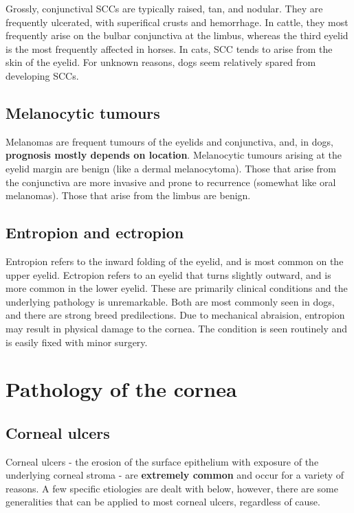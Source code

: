 \documentclass[openany]{article}
\begin{document}
Grossly, conjunctival SCCs are typically raised, tan, and nodular. They
are frequently ulcerated, with superifical crusts and hemorrhage. In
cattle, they most frequently arise on the bulbar conjunctiva at the
limbus, whereas the third eyelid is the most frequently affected in
horses. In cats, SCC tends to arise from the skin of the eyelid. For
unknown reasons, dogs seem relatively spared from developing SCCs.

\subsection{Melanocytic tumours}\label{melanocytic-tumours}

Melanomas are frequent tumours of the eyelids and conjunctiva, and, in
dogs, \textbf{prognosis mostly depends on location}. Melanocytic tumours
arising at the eyelid margin are benign (like a dermal melanocytoma).
Those that arise from the conjunctiva are more invasive and prone to
recurrence (somewhat like oral melanomas). Those that arise from the
limbus are benign.

\hypertarget{entropion-and-ectropion}{\subsection{Entropion and
ectropion}\label{entropion-and-ectropion}}

Entropion refers to the inward folding of the eyelid, and is most common
on the upper eyelid. Ectropion refers to an eyelid that turns slightly
outward, and is more common in the lower eyelid. These are primarily
clinical conditions and the underlying pathology is unremarkable. Both
are most commonly seen in dogs, and there are strong breed
predilections. Due to mechanical abraision, entropion may result in
physical damage to the cornea. The condition is seen routinely and is
easily fixed with minor surgery.

\section{Pathology of the cornea}\label{pathology-of-the-cornea}

\subsection{Corneal ulcers}\label{corneal-ulcers}

Corneal ulcers - the erosion of the surface epithelium with exposure of
the underlying corneal stroma - are \textbf{extremely common} and occur
for a variety of reasons. A few specific etiologies are dealt with
below, however, there are some generalities that can be applied to most
corneal ulcers, regardless of cause.
\end{document}

